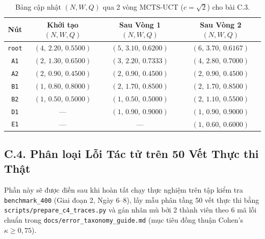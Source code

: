 \begin{table}[htbp]
  \centering
  \caption{Bảng cập nhật $(N, W, Q)$ qua 2 vòng MCTS-UCT ($c = \sqrt{2}$) cho bài C.3.}
  \label{tab:c3-trace}
  \begin{tabular}{cccc}
    \toprule
    Nút & Khởi tạo $(N, W, Q)$ & Sau Vòng 1 $(N, W, Q)$ & Sau Vòng 2 $(N, W, Q)$ \\
    \midrule
    \texttt{root} & $(4,\, 2.20,\, 0.5500)$ & $(5,\, 3.10,\, 0.6200)$ & $(6,\, 3.70,\, 0.6167)$ \\
    \texttt{A1}   & $(2,\, 1.30,\, 0.6500)$ & $(3,\, 2.20,\, 0.7333)$ & $(4,\, 2.80,\, 0.7000)$ \\
    \texttt{A2}   & $(2,\, 0.90,\, 0.4500)$ & $(2,\, 0.90,\, 0.4500)$ & $(2,\, 0.90,\, 0.4500)$ \\
    \texttt{B1}   & $(1,\, 0.80,\, 0.8000)$ & $(2,\, 1.70,\, 0.8500)$ & $(2,\, 1.70,\, 0.8500)$ \\
    \texttt{B2}   & $(1,\, 0.50,\, 0.5000)$ & $(1,\, 0.50,\, 0.5000)$ & $(2,\, 1.10,\, 0.5500)$ \\
    \texttt{D1}   & ---                     & $(1,\, 0.90,\, 0.9000)$ & $(1,\, 0.90,\, 0.9000)$ \\
    \texttt{E1}   & ---                     & ---                     & $(1,\, 0.60,\, 0.6000)$ \\
    \bottomrule
  \end{tabular}
\end{table}

\subsection{C.4. Phân loại Lỗi Tác tử trên 50 Vết Thực thi Thật}
\label{subsec:c4}

Phần này sẽ được điền sau khi hoàn tất chạy thực nghiệm trên tập kiểm tra \texttt{benchmark\_400} (Giai đoạn 2, Ngày 6--8), lấy mẫu phân tầng 50 vết thực thi bằng \texttt{scripts/prepare\_c4\_traces.py} và gán nhãn mù bởi 2 thành viên theo 6 mã lỗi chuẩn trong \texttt{docs/error\_taxonomy\_guide.md} (mục tiêu đồng thuận Cohen's $\kappa \ge 0{,}75$).
